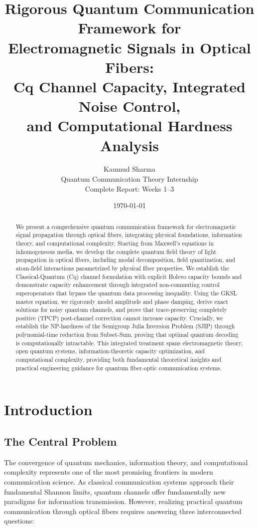 \documentclass[12pt,a4paper]{article}
\title{\textbf{Rigorous Quantum Communication Framework for\\
Electromagnetic Signals in Optical Fibers:\\
Cq Channel Capacity, Integrated Noise Control,\\
and Computational Hardness Analysis}}
\author{Kaumud Sharma\\
Quantum Communication Theory Internship\\
Complete Report: Weeks 1--3}
\date{\today}
\begin{document}
\maketitle

\begin{abstract}
We present a comprehensive quantum communication framework for electromagnetic signal propagation through optical fibers, integrating physical foundations, information theory, and computational complexity. Starting from Maxwell's equations in inhomogeneous media, we develop the complete quantum field theory of light propagation in optical fibers, including modal decomposition, field quantization, and atom-field interactions parametrized by physical fiber properties. We establish the Classical-Quantum (Cq) channel formulation with explicit Holevo capacity bounds and demonstrate capacity enhancement through integrated non-commuting control superoperators that bypass the quantum data processing inequality. Using the GKSL master equation, we rigorously model amplitude and phase damping, derive exact solutions for noisy quantum channels, and prove that trace-preserving completely positive (TPCP) post-channel correction cannot increase capacity. Crucially, we establish the NP-hardness of the Semigroup Julia Inversion Problem (SJIP) through polynomial-time reduction from Subset-Sum, proving that optimal quantum decoding is computationally intractable. This integrated treatment spans electromagnetic theory, open quantum systems, information-theoretic capacity optimization, and computational complexity, providing both fundamental theoretical insights and practical engineering guidance for quantum fiber-optic communication systems.
\end{abstract}

\tableofcontents
\newpage

\section{Introduction}

\subsection{The Central Problem}

The convergence of quantum mechanics, information theory, and computational complexity represents one of the most promising frontiers in modern communication science. As classical communication systems approach their fundamental Shannon limits, quantum channels offer fundamentally new paradigms for information transmission. However, realizing practical quantum communication through optical fibers requires answering three interconnected questions:
\end{document}
